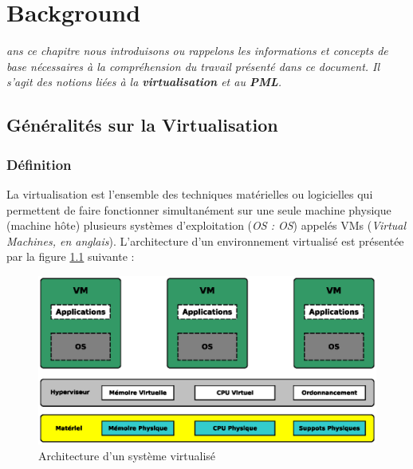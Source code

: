 \let\textcircled=\pgftextcircled
\chapter{Background}
\label{chap:background}

\textit{ans ce chapitre nous introduisons ou rappelons les informations et concepts de base nécessaires à la compréhension du travail présenté dans ce document. Il s'agit des notions liées à la \textbf{virtualisation} et au \textbf{PML}.}

\minitoc

\newpage    
\section{Généralités sur la Virtualisation}

\subsection{Définition}
\par\noindent La virtualisation est l’ensemble des techniques matérielles ou logicielles qui permettent de faire fonctionner simultanément sur une seule machine physique (machine hôte) plusieurs systèmes d’exploitation (\textit{\acs{OS} : \acl{OS}}) appelés \ac{VMs} (\textit{Virtual Machines, en anglais}). L'architecture d'un environnement virtualisé est présentée par la figure \ref{fig:environnement_virtualise} suivante :\\

\begin{figure}[H]
    \centering
    \includegraphics[scale=.7]{chapters/1/fig1/environnement_virtualise}
    \caption{Architecture d'un système virtualisé}
    \label{fig:environnement_virtualise}
\end{figure}

